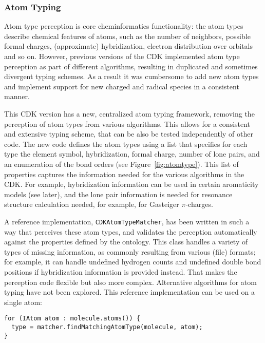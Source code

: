 \documentclass[doublespacing]{bmcart}
\begin{document}
  \subsubsection*{Atom Typing}

  Atom type perception is core cheminformatics functionality: the
  atom types describe chemical features of atoms, such as the number
  of neighbors, possible formal charges, (approximate) hybridization,
  electron distribution over orbitals and so on. However, previous
  versions of the CDK implemented atom type perception as part of
  different algorithms, resulting in duplicated and sometimes
  divergent typing schemes. As a result it was cumbersome to add new
  atom types and implement support for new charged and radical species
  in a consistent manner.
  
  This CDK version has a new, centralized atom typing framework,
  removing the perception of atom types from various algorithms. This
  allows for a consistent and extensive typing scheme, that can be
  also be tested independently of other code.  The new code defines
  the atom types using a list that specifies for each type the element
  symbol, hybridization, formal charge, number of lone pairs, and an
  enumeration of the bond orders (see Figure~\ref{fig:atomtype}). This list of
  properties captures the information needed for the various
  algorithms in the CDK. For example, hybridization information can be
  used in certain aromaticity models (see later), and the lone pair
  information is needed for resonance structure calculation needed,
  for example, for Gasteiger $\pi$-charges.

  A reference implementation, \texttt{CDKAtomTypeMatcher}, has been
  written in such a way that perceives these atom types, and validates the
  perception automatically against the properties defined by the
  ontology.  This class handles a variety of types of missing
  information, as commonly resulting from various (file) formats; for
  example, it can handle undefined hydrogen counts and undefined
  double bond positions if hybridization information is provided
  instead.  That makes the perception code flexible but also more
  complex. Alternative algorithms for atom typing have not been
  explored. This reference implementation can be used on a single
  atom:

\vspace{0.2cm}
\begin{verbatim}
for (IAtom atom : molecule.atoms()) {
  type = matcher.findMatchingAtomType(molecule, atom);
}
\end{verbatim}
\vspace{0.2cm}
\end{document}
